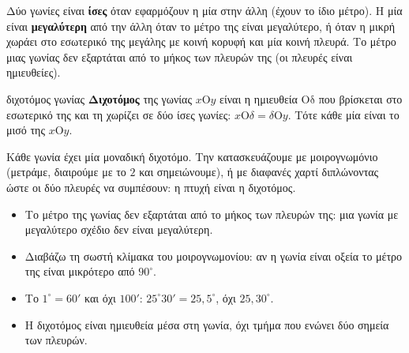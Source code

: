 
Δύο γωνίες είναι \textbf{ίσες} όταν εφαρμόζουν η μία στην άλλη (έχουν το ίδιο μέτρο). Η μία είναι \textbf{μεγαλύτερη} από την άλλη όταν το μέτρο της είναι μεγαλύτερο, ή όταν η μικρή χωράει στο εσωτερικό της μεγάλης με κοινή κορυφή και μία κοινή πλευρά. Το μέτρο μιας γωνίας δεν εξαρτάται από το μήκος των πλευρών της (οι πλευρές είναι ημιευθείες).


\begin{orismos}{διχοτόμος γωνίας}
\textbf{Διχοτόμος} της γωνίας $x\mathrm{Ο}y$ είναι η ημιευθεία $\mathrm{Οδ}$ που βρίσκεται στο εσωτερικό της και τη χωρίζει σε δύο ίσες γωνίες: $x\mathrm{Ο}\delta=\delta\mathrm{Ο}y$. Τότε κάθε μία είναι το μισό της $x\mathrm{Ο}y$.
\end{orismos}

\begin{center}
\end{center}

Κάθε γωνία έχει μία μοναδική διχοτόμο. Την κατασκευάζουμε με μοιρογνωμόνιο (μετράμε, διαιρούμε με το $2$ και σημειώνουμε), ή με διαφανές χαρτί διπλώνοντας ώστε οι δύο πλευρές να συμπέσουν: η πτυχή είναι η διχοτόμος.

\begin{prosoxi}
\begin{itemize}[leftmargin=1.2em,itemsep=0.3ex,topsep=2pt]
\item Το μέτρο της γωνίας δεν εξαρτάται από το μήκος των πλευρών της: μια γωνία με μεγαλύτερο σχέδιο δεν είναι μεγαλύτερη.
\item Διαβάζω τη σωστή κλίμακα του μοιρογνωμονίου: αν η γωνία είναι οξεία το μέτρο της είναι μικρότερο από $90^\circ$.
\item Το $1^\circ=60'$ και όχι $100'$: $25^\circ30'=25{,}5^\circ$, όχι $25{,}30^\circ$.
\item Η διχοτόμος είναι ημιευθεία μέσα στη γωνία, όχι τμήμα που ενώνει δύο σημεία των πλευρών.
\end{itemize}
\end{prosoxi}

